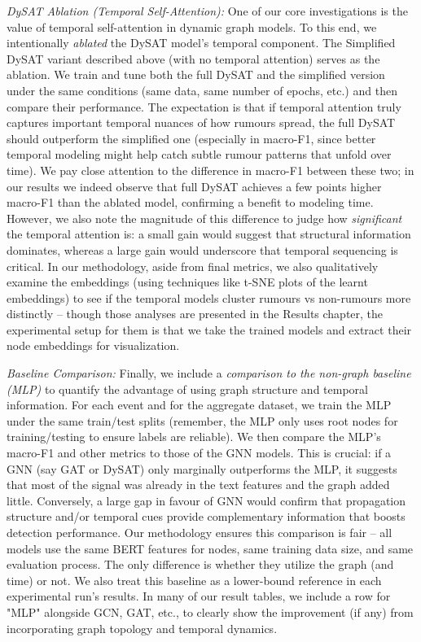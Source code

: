 \documentclass{cshonours}
\begin{document}
\emph{DySAT Ablation (Temporal Self-Attention):} One of our core investigations is the value of temporal self-attention in dynamic graph models. To this end, we intentionally \emph{ablated} the DySAT model's temporal component. The Simplified DySAT variant described above (with no temporal attention) serves as the ablation. We train and tune both the full DySAT and the simplified version under the same conditions (same data, same number of epochs, etc.) and then compare their performance. The expectation is that if temporal attention truly captures important temporal nuances of how rumours spread, the full DySAT should outperform the simplified one (especially in macro-F1, since better temporal modeling might help catch subtle rumour patterns that unfold over time). We pay close attention to the difference in macro-F1 between these two; in our results we indeed observe that full DySAT achieves a few points higher macro-F1 than the ablated model, confirming a benefit to modeling time. However, we also note the magnitude of this difference to judge how \emph{significant} the temporal attention is: a small gain would suggest that structural information dominates, whereas a large gain would underscore that temporal sequencing is critical. In our methodology, aside from final metrics, we also qualitatively examine the embeddings (using techniques like t-SNE plots of the learnt embeddings) to see if the temporal models cluster rumours vs non-rumours more distinctly – though those analyses are presented in the Results chapter, the experimental setup for them is that we take the trained models and extract their node embeddings for visualization.

\emph{Baseline Comparison:} Finally, we include a \emph{comparison to the non-graph baseline (MLP)} to quantify the advantage of using graph structure and temporal information. For each event and for the aggregate dataset, we train the MLP under the same train/test splits (remember, the MLP only uses root nodes for training/testing to ensure labels are reliable). We then compare the MLP's macro-F1 and other metrics to those of the GNN models. This is crucial: if a GNN (say GAT or DySAT) only marginally outperforms the MLP, it suggests that most of the signal was already in the text features and the graph added little. Conversely, a large gap in favour of GNN would confirm that propagation structure and/or temporal cues provide complementary information that boosts detection performance. Our methodology ensures this comparison is fair – all models use the same BERT features for nodes, same training data size, and same evaluation process. The only difference is whether they utilize the graph (and time) or not. We also treat this baseline as a lower-bound reference in each experimental run's results. In many of our result tables, we include a row for "MLP" alongside GCN, GAT, etc., to clearly show the improvement (if any) from incorporating graph topology and temporal dynamics.
\end{document}
